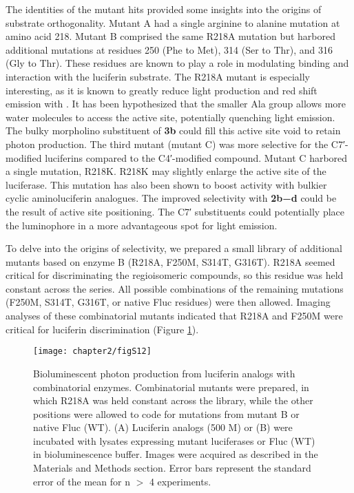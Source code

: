 The identities
of the mutant hits provided some insights into the origins of
substrate orthogonality. Mutant A had a single arginine to
alanine mutation at amino acid 218. Mutant B comprised the
same R218A mutation but harbored additional mutations at
residues 250 (Phe to Met), 314 (Ser to Thr), and 316 (Gly to
Thr). These residues are known to play a role in modulating
binding and interaction with the luciferin substrate. The R218A
mutant is especially interesting, as it is known to greatly reduce
light production and red shift emission with \dluciferin{}.\cite{BRANCHINI:2001gr} It has
been hypothesized that the smaller Ala group allows more
water molecules to access the active site, potentially quenching
light emission.\cite{BRANCHINI:2001gr} The bulky morpholino substituent of \textbf{3b} could
fill this active site void to retain photon production. The third
mutant (mutant C) was more selective for the C7′-modified
luciferins compared to the C4′-modified compound. Mutant C
harbored a single mutation, R218K. R218K may slightly enlarge
the active site of the luciferase. This mutation has also been
shown to boost activity with bulkier cyclic aminoluciferin
analogues.\cite{Harwood:2011gl} The improved selectivity with \textbf{2b−d} could be the
result of active site positioning. The C7′ substituents could
potentially place the luminophore in a more advantageous spot
for light emission.
\par
To delve into the origins of selectivity, we prepared a small
library of additional mutants based on enzyme B (R218A,
F250M, S314T, G316T). R218A seemed critical for discriminating
the regioisomeric compounds, so this residue was held
constant across the series. All possible combinations of the
remaining mutations (F250M, S314T, G316T, or native Fluc
residues) were then allowed. Imaging analyses of these
combinatorial mutants indicated that R218A and F250M
were critical for luciferin discrimination (Figure \ref{fig:muts_vs_cmpds}).
\begin{figure}[htbp]
\texttt{[image: chapter2/figS12]}
\centering
\caption[Bioluminescent photon production from luciferin analogs with combinatorial enzymes]{Bioluminescent photon production from luciferin analogs with combinatorial enzymes. Combinatorial mutants were prepared, in which R218A was held constant across the library, while the other positions were allowed to code for mutations from mutant B or native Fluc (WT). (A) Luciferin analogs (500 \textmu{}M) or (B) \dluciferin{} were incubated with lysates expressing mutant luciferases or Fluc (WT) in bioluminescence buffer. Images were acquired as described in the Materials and Methods section. Error bars represent the standard error of the mean for n $>$ 4 experiments.}
  \label{fig:muts_vs_cmpds}
\end{figure}
